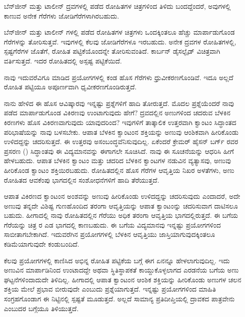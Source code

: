 ಬೆನ್‍ಜೀನ್ ಮತ್ತು ಟಾಲೀನ್ ದ್ರವಗಳಲ್ಲಿ ಪಡೆದ ರೋಹಿತಗಳ ಚಿತ್ರಗಳಿಂದ ತಿಳಿದು ಬಂದ\-ದ್ದೆಂದರೆ, ಅವುಗಳಲ್ಲಿ ಕಾಣುವ ಅನೇಕ ಗೆರೆಗಳು ಜೋಡಿಗೆರೆಗಳಾಗಿರಬಹುದು.

ಬೆನ್‍ಜೀನ್ ಮತ್ತು ಟಾಲೀನ್ ಗಳಲ್ಲಿ ಪಡೆದ ರೋಹಿತಗಳ ಚಿತ್ರಗಳು ಒಂದಕ್ಕಿಂತಲೂ ಹೆಚ್ಚು ಮಾರ್ಪಾಡುಗೊಂಡ ಗೆರೆಗಳನ್ನು ತೋರಿಸುತ್ತವೆ. ಇವುಗಳಲ್ಲಿ ಕೆಲವು ಜೋಡಿಗೆರೆಗಳೂ ಇರಬಹುದು. ಅನೇಕ ದ್ರವಗಳ ರೋಹಿತಗಳಲ್ಲಿ, ಸ್ಪಷ್ಟಗೆರೆಗಳ ಜೊತೆಗೆ, ರೋಹಿತ ಪಟ್ಟಿಕೆಯೊಂದನ್ನೇ ತೋರಿಸು\-ವಂತಿದೆ. ಕಾರ್ಬನ್ ಡೈಸಲ್ಫೈಡ್ ವಿಚಿತ್ರವಾಗಿ ವರ್ತಿಸುತ್ತದೆ. ಇದರ ರೋಹಿತದಲ್ಲಿ ಅಸ್ಪಷ್ಟ ಪಟ್ಟಿಕೆಯಿದೆ.

ನಾವು ಇದುವರೆವಿಗೂ ಮಾಡಿದ ಪ್ರಯೋಗಗಳಲ್ಲಿ ಕಂಡ ಹೊಸ ಗೆರೆಗಳು ಧ್ರುವೀಕರಣಗೊಂಡಿವೆ. ಇದೂ ಅಲ್ಲದೆ ರೋಹಿತ ಪಟ್ಟಿಯೂ ಅಪೂರ್ಣವಾಗಿ ಧೃವೀಕರಣಗೊಂಡಿರುತ್ತದೆ.



ನಾನು ಹೇಳಿದ ಈ ಹೊಸ ಆವಿಷ್ಕಾರವು ಇನ್ನಷ್ಟು ಪ್ರಶ್ನೆಗಳಿಗೆ ಹಾದಿ ತೋರುತ್ತದೆ. ಮೊದಲ ಪ್ರಶ್ನೆಯೆಂದರೆ ನಾವು ಪಡೆದ ಮಾರ್ಪಾಡುಗೊಂಡ ವಿಕಿರಣವು ಉಂಟಾಗುವುದು ಹೇಗೆ? ದ್ರವದಲ್ಲಿನ ಅಣುಗಳಿಂದ ಚದರುವ ಬೆಳಕಿನ ಕಿರಣಗಳು ಹೊಸ ವಿಕಿರಣವಾಗುವುದು ಯಾವುದರಿಂದ? ಇವುಗಳಿಗೆ ತಾತ್ಕಾಲಿಕ ಉತ್ತರವಾಗಿ ಕ್ವಾಂಟಂ ಸಿದ್ಧಾಂತದ ಪರಿಭಾಷೆಯನ್ನು ನಾವು ಬಳಸಬೇಕು. ಆಪಾತ ಬೆಳಕಿನ ಕ್ವಾಂಟಂನ ಶಕ್ತಿಯನ್ನು ಅಣುವು ಆಂಶಿಕವಾಗಿ ಹೀರಿಕೊಂಡು ಉಳಿದದ್ದನ್ನು ಚದರಿಸುತ್ತದೆ. ಈ ಉತ್ತರವು ಅಸಂಬಂದ್ಧವೆನಿಸುವುದಿಲ್ಲ. ಏಕೆಂದರೆ ಕ್ರೇಮರ್\enginline{-} ಹೈಸನ್ ಬರ್ಗ್ ರವರ ಪ್ರಸರಣ () ಸಿದ್ಧಾಂತವು ಈ ವಿದ್ಯಮಾನವನ್ನು ಈಗಾಗಲೇ ಸೂಚಿಸಿದೆ. ನಾವು ಈ ಸೂಚನೆಯನ್ನು ಆಧರಿಸಿ ಹೀಗೆ ಹೇಳಬಹುದು. ಆಪಾತ ಬೆಳಕಿನ ಕ್ವಾಂಟಂ ಮತ್ತು ಚದರಿದ ಬೆಳಕಿನ ಕ್ವಾಂಟಗಳ ನಡುವಿನ ವ್ಯತ್ಯಾಸವು, ಅಣುವು ಹೀರಿಕೊಂಡ ಕ್ವಾಂಟಂ ಶಕ್ತಿಯಿರಬಹುದು. ರೋಹಿತದಲ್ಲಿನ ಹೊಸ ಗೆರೆಗಳ ಆವೃತ್ತಿಯ ನಿಖರ ಅಳತೆಗಳು, ಅಣು ರೋಹಿತದ ಆವಕೆಂಪು ಭಾಗದಲ್ಲಿನ ಸಂಶೋಧನೆಗಳಿಗೆ ಹಾದಿ ತೆರೆಯುತ್ತದೆ.

ಆಪಾತ ವಿಕಿರಣದ ಕ್ವಾಂಟಂನ ಅಂಶವನ್ನು ಅಣುವು ಹೀರಿಕೊಂಡು ಉಳಿದದ್ದನ್ನು ಚದರಿಸುವುದು ಎಂದಾದರೆ, ಅದೇ ಅಣುವು ತನ್ನದೇ ವಿಶಿಷ್ಟ ಗುಣಹೊಂದಿದ ತರಂಗಾ ಆವೃತ್ತಿಯನ್ನು ಆಪಾತ ಕ್ವಾಂಟಂನ್ನು ಚದರಿಸುವಾಗ ದಾಟಿಸಲೂ ಬಹುದು. ಹೀಗಾದಲ್ಲಿ ನಾವು ರೋಹಿತದಲ್ಲಿನ ಗೆರೆಯು ಅಧಿಕ ತರಂಗಾ ಆವೃತ್ತಿಯ ಭಾಗದಲ್ಲಿರುತ್ತದೆ. ಈ ಬಗೆಯ ಗೆರೆಯನ್ನು ಚಿತ್ರ  ರ ಎಡ ಭಾಗದಲ್ಲಿ ಕಾಣಬಹುದು. ಈ ಬಗೆಯ ವಿದ್ಯಮಾನವು ಇನ್ನಷ್ಟು ಪ್ರಯೋಗಗಳಿಂದ ಸಾಬೀತಾಗಬೇಕಾಗಿದೆ. ಇದುವರೆಗಿನ ಪ್ರಯೋಗಗಳಲ್ಲಿ ಬೆಳಕಿನ ಆವೃತ್ತಿಯು ಜಾಸ್ತಿಯಾಗು\-ವುದಕ್ಕಿಂತಲೂ ಕಡಿಮೆಯಾಗುವುದೇ ಕಂಡುಬಂದಿದೆ.

ಕೆಲವು ಪ್ರಯೋಗಗಳಲ್ಲಿ ಕಾಣಿಸಿದ ಅಭಿನ್ನ ರೋಹಿತ ಪಟ್ಟಿಕೆಯ ಬಗ್ಗೆ ಈಗ ಏನನ್ನೂ ಹೇಳಲಾಗುವು\-ದಿಲ್ಲ. ಇದು ಅಣುವಿನ ಮಾರ್ಪಾಡಿನಿಂದ ಉಂಟಾದದ್ದೇ ಅಥವಾ ಸ್ಥಿತಿಸ್ಥಾಪಕತೆ ಕಾಯ್ದುಕೊಳ್ಳಲಾಗದ ಎರಡನೆಯ ಬಗೆಯ ಅಣು ಘಟ್ಟನೆಗಳಿಂದಾದುದೇ ತಿಳಿದಿಲ್ಲ. ಹೀಗಾದಲ್ಲಿ ಆಪಾತ ಕ್ವಾಂಟಂನ ಆಂಶಿಕ ಶಕ್ತಿಯನ್ನು ಹೀರಿಕೊಂಡು ಅಣುಗಳ ಚಲನ ಶಕ್ತಿಯ ಮೇಲೆ ಪ್ರಭಾವ ಬೀರುವುದೇ ಎಂಬುದು ಪ್ರಶ್ನೆಯಾಗುತ್ತದೆ. ಇನ್ನಷ್ಟು ಪ್ರಯೋಗಗಳಿಂದ ಮಾಹಿತಿ ಸಂಗ್ರಹಗೊಂಡಾಗ ಈ ನಿಟ್ಟಿನಲ್ಲಿ ಸ್ಪಷ್ಟತೆ ಮೂಡುತ್ತದೆ. ಅಲ್ಲದೆ ಸಾಮಾನ್ಯ ಪ್ರತಿದೀಪ್ತಿಯಲ್ಲಿ ದ್ರಾವಕದ ಪಾತ್ರವೇನು ಎಂಬುದರ ಬಗ್ಗೆಯೂ ತಿಳಿಯುತ್ತದೆ.




